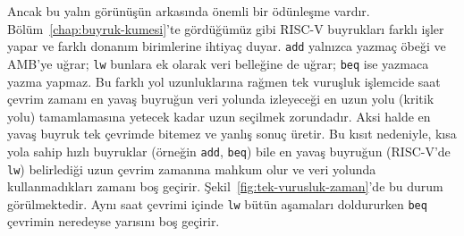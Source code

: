 Ancak bu yalın görünüşün arkasında önemli bir ödünleşme vardır. Bölüm~\ref{chap:buyruk-kumesi}'te gördüğümüz gibi RISC-V buyrukları farklı işler yapar ve farklı donanım birimlerine ihtiyaç duyar. \texttt{add} yalnızca yazmaç öbeği ve AMB'ye uğrar; \texttt{lw} bunlara ek olarak veri belleğine de uğrar; \texttt{beq} ise yazmaca yazma yapmaz. Bu farklı yol uzunluklarına rağmen tek vuruşluk işlemcide saat çevrim zamanı en yavaş buyruğun veri yolunda izleyeceği en uzun yolu (kritik yolu) tamamlamasına yetecek kadar uzun seçilmek zorundadır. Aksi halde en yavaş buyruk tek çevrimde bitemez ve yanlış sonuç üretir. Bu kısıt nedeniyle, kısa yola sahip hızlı buyruklar (örneğin \texttt{add}, \texttt{beq}) bile en yavaş buyruğun (RISC-V'de \texttt{lw}) belirlediği uzun çevrim zamanına mahkum olur ve veri yolunda kullanmadıkları zamanı boş geçirir. Şekil~\ref{fig:tek-vurusluk-zaman}'de bu durum görülmektedir. Aynı saat çevrimi içinde \texttt{lw} bütün aşamaları doldururken \texttt{beq} çevrimin neredeyse yarısını boş geçirir.

